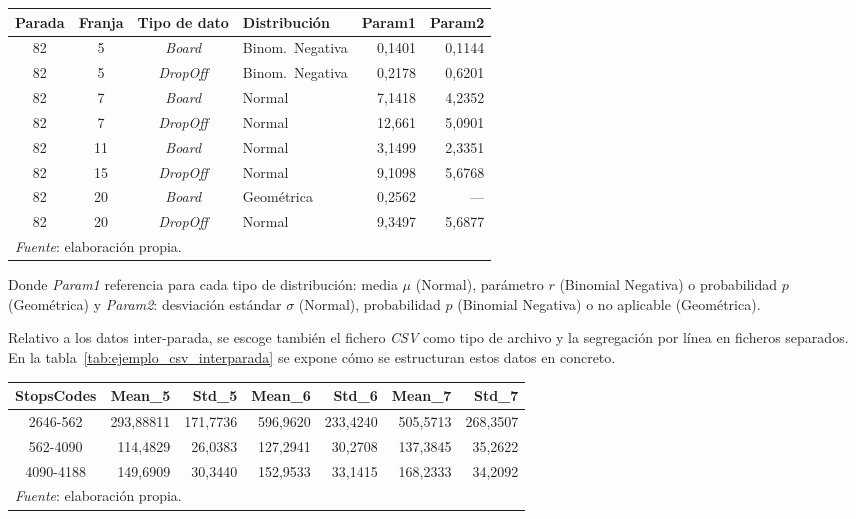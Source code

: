 \begin{table}[H]
\centering
{}
{\centering\small\begin{tabular}{ccclrr}
\toprule
\textbf{Parada} & \textbf{Franja} & \textbf{Tipo de dato} &
\textbf{Distribución} & \textbf{Param1} & \textbf{Param2} \\
\midrule
82 & 5  & \textit{Board}   & Binom.\ Negativa & 0,1401 & 0,1144 \\
82 & 5  & \textit{DropOff} & Binom.\ Negativa & 0,2178 & 0,6201 \\
82 & 7  & \textit{Board}   & Normal           & 7,1418 & 4,2352 \\
82 & 7  & \textit{DropOff} & Normal           & 12,661 & 5,0901 \\
82 & 11 & \textit{Board}   & Normal           & 3,1499 & 2,3351 \\
82 & 15 & \textit{DropOff} & Normal           & 9,1098 & 5,6768 \\
82 & 20 & \textit{Board}   & Geométrica       & 0,2562 & ---    \\
82 & 20 & \textit{DropOff} & Normal           & 9,3497 & 5,6877 \\
\bottomrule
\multicolumn{6}{l}{\small\textit{Fuente}: elaboración propia.}
\end{tabular}}
\end{table}

Donde \textit{Param1} referencia para cada tipo de distribución: media $\mu$ (Normal), parámetro $r$ (Binomial Negativa)
      o probabilidad $p$ (Geométrica)
y \textit{Param2}: desviación estándar $\sigma$ (Normal), probabilidad $p$ (Binomial Negativa) o no aplicable (Geométrica).

Relativo a los datos inter-parada, se escoge también el fichero \textit{CSV} como tipo de archivo y la segregación por línea
en ficheros separados. En la tabla~\ref{tab:ejemplo_csv_interparada} se expone cómo se estructuran estos datos en concreto.

\begin{table}[H]
\centering
{}
{\centering\small\begin{tabular}{crrrrrr}
\toprule
\textbf{StopsCodes} & \textbf{Mean\_5} & \textbf{Std\_5} &
\textbf{Mean\_6} & \textbf{Std\_6} & \textbf{Mean\_7} & \textbf{Std\_7}\\
\midrule
2646-562 & 293,88811 & 171,7736 & 596,9620 & 233,4240 & 505,5713 & 268,3507 \\
562-4090  & 114,4829 & 26,0383 & 127,2941 & 30,2708 & 137,3845 & 35,2622 \\
4090-4188 & 149,6909 & 30,3440 & 152,9533 & 33,1415 & 168,2333 & 34,2092 \\
\bottomrule
\multicolumn{7}{l}{\small\textit{Fuente}: elaboración propia.}
\end{tabular}}
\end{table}

